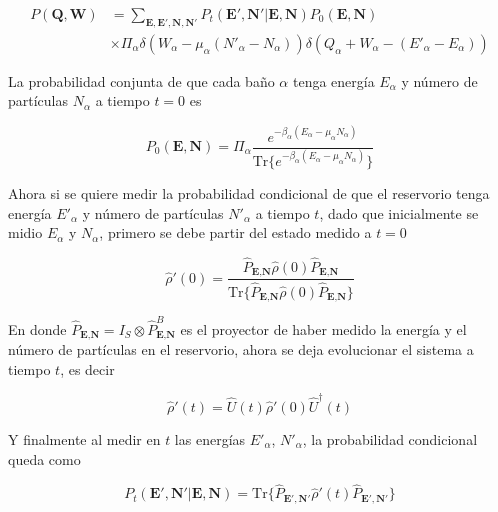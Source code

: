 \begin{align*}
    P(\textbf{Q},\textbf{W}) & = \sum_{\textbf{E},\textbf{E}',\textbf{N},\textbf{N}'} P_{t}(\textbf{E}',\textbf{N}'|\textbf{E},\textbf{N}) P_{0}(\textbf{E},\textbf{N})\\
                             & \times \Pi_{\alpha} \delta(W_{\alpha} - \mu_{\alpha}(N'_{\alpha} - N_{\alpha})) \delta(Q_{\alpha} + W_{\alpha}  - (E'_{\alpha} - E_{\alpha}))   
\end{align*}

La probabilidad conjunta de que cada baño $\alpha$ tenga energía $E_{\alpha}$ y número de partículas $N_{\alpha}$ a tiempo $t=0$ es

\begin{equation*}
    P_{0}(\textbf{E},\textbf{N}) = \Pi_{\alpha}  \frac{e^{-\beta_{\alpha}(E_{\alpha} - \mu_{\alpha}N_{\alpha} )  }}{ \text{Tr}\{e^{-\beta_{\alpha}(E_{\alpha} - \mu_{\alpha}N_{\alpha} )  }\} } 
\end{equation*}

Ahora si se quiere medir la probabilidad condicional de que el reservorio tenga energía $E'_{\alpha}$ y número de partículas $N'_{\alpha}$ a tiempo $t$, dado que inicialmente se midio $E_{\alpha}$ y $N_{\alpha}$, primero se debe partir del estado medido a $t=0$

\begin{equation*}
    \hat{\rho}'(0) = \frac{\hat{P}_{\textbf{E}, \textbf{N} }\hat{\rho}(0) \hat{P}_{\textbf{E}, \textbf{N} } }{\text{Tr}\{\hat{P}_{\textbf{E}, \textbf{N} }\hat{\rho}(0) \hat{P}_{\textbf{E}, \textbf{N} } \} }
\end{equation*}

En donde $\hat{P}_{\textbf{E}, \textbf{N} } = I_{S} \otimes \hat{P}^{B}_{\textbf{E}, \textbf{N} }$ es el proyector de haber medido la energía y el número de partículas en el reservorio, ahora se deja evolucionar el sistema a tiempo $t$, es decir

\begin{equation*}
    \hat{\rho}'(t) = \hat{U}(t)\hat{\rho}'(0)\hat{U}^{\dagger}(t)
\end{equation*}

Y finalmente al medir en $t$ las energías $E'_{\alpha}$, $N'_{\alpha}$, la probabilidad condicional queda como

\begin{equation*}
    P_{t}(\textbf{E}',\textbf{N}'|\textbf{E},\textbf{N}) = \text{Tr}\{\hat{P}_{\textbf{E}', \textbf{N}' }\hat{\rho}'(t) \hat{P}_{\textbf{E}', \textbf{N}' } \}
\end{equation*}

